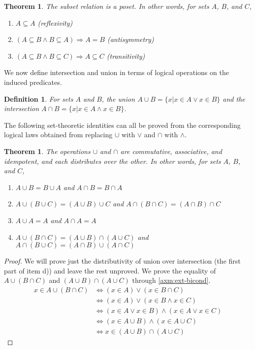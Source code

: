 \documentclass[12pt]{article}
\newcounter{dfnc}
\newcounter{thmc}
\newtheorem{dfn}[dfnc]{Definition}
\newtheorem{thm}[thmc]{Theorem}
\begin{document}
\begin{thm}\label{thm:poset}
  The subset relation is a poset.  In other words, for sets $A$, $B$,
  and $C$,
  \begin{enumerate}[label=\alph*)]
  \item $A\subseteq A$ (reflexivity)
  \item $(A\subseteq B \wedge B\subseteq A)\Rightarrow A=B$ (antisymmetry)
  \item $(A\subseteq B \wedge B\subseteq C)\Rightarrow A\subseteq C$ (transitivity)
  \end{enumerate}
\end{thm}

We now define intersection and union in terms of logical operations on
the induced predicates.

\begin{dfn}
  For sets $A$ and $B$, the union $A\cup B = \{x|x\in A \vee x\in B\}$
  and the intersection $A\cap B = \{x|x\in A \wedge x\in B\}$.
\end{dfn}

The following set-theoretic identities can all be proved from the
corresponding logical laws obtained from replacing $\cup$ with $\vee$
and $\cap$ with $\wedge$.

\begin{thm}\label{thm:op}
  The operations $\cup$ and $\cap$ are commutative, associative, and
  idempotent, and each distributes over the other.  In other words,
  for sets $A$, $B$, and $C$,
  \begin{enumerate}[label=\alph*)]
  \item $A\cup B=B\cup A$ and $A\cap B=B\cap A$
  \item $A\cup (B\cup C)=(A\cup B)\cup C$ and $A\cap (B\cap C)=(A\cap B)\cap C$
  \item $A\cup A=A$ and $A\cap A=A$
  \item $A\cup(B\cap C)=(A\cup B)\cap(A\cup C)$ and $A\cap(B\cup C)=(A\cap
    B)\cup(A\cap C)$
  \end{enumerate}
\end{thm}

\begin{proof}
  We will prove just the distributivity of union over intersection
  (the first part of item d)) and leave the rest unproved.  We prove
  the equality of $A\cup(B\cap C)$ and $(A\cup B)\cap(A\cup C)$
  through \ref{axm:ext-bicond}.
  \begin{align*}
    x\in A\cup(B\cap C)
    &\Leftrightarrow (x\in A)\vee(x\in B\cap C) \\
    &\Leftrightarrow (x\in A)\vee(x\in B\wedge x\in C) \\
    &\Leftrightarrow (x\in A\vee x\in B)\wedge (x\in A\vee x\in C)\\
    &\Leftrightarrow (x\in A\cup B)\wedge (x\in A\cup C)\\
    &\Leftrightarrow x\in (A\cup B)\cap(A\cup C)
  \end{align*}
\end{proof}
\end{document}
